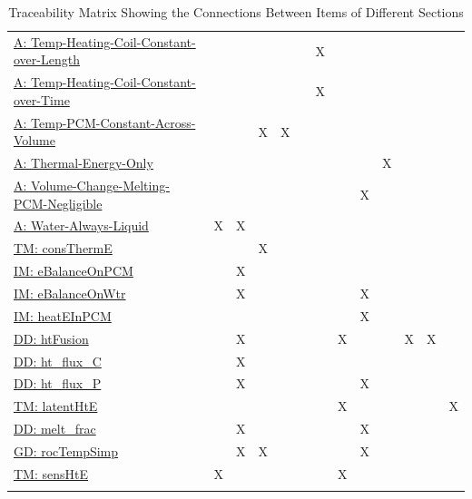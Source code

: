 \documentclass[12pt]{article}
\begin{document}
\begin{longtable}{l l l l l l l l l l l l l}
\\
\hyperref[A:Temp-Heating-Coil-Constant-over-Length]{A: Temp-Heating-Coil-Constant-over-Length} &  &  &  &  &  & X &  &  &  &  &  & 
\\
\hyperref[A:Temp-Heating-Coil-Constant-over-Time]{A: Temp-Heating-Coil-Constant-over-Time} &  &  &  &  &  & X &  &  &  &  &  & 
\\
\hyperref[A:Temp-PCM-Constant-Across-Volume]{A: Temp-PCM-Constant-Across-Volume} &  &  & X & X &  &  &  &  &  &  &  & 
\\
\hyperref[A:Thermal-Energy-Only]{A: Thermal-Energy-Only} &  &  &  &  &  &  &  &  & X &  &  & 
\\
\hyperref[A:Volume-Change-Melting-PCM-Negligible]{A: Volume-Change-Melting-PCM-Negligible} &  &  &  &  &  &  &  & X &  &  &  & 
\\
\hyperref[A:Water-Always-Liquid]{A: Water-Always-Liquid} & X & X &  &  &  &  &  &  &  &  &  & 
\\
\hyperref[T:consThermE]{TM: consThermE} &  &  & X &  &  &  &  &  &  &  &  & 
\\
\hyperref[IM:eBalanceOnPCM]{IM: eBalanceOnPCM} &  & X &  &  &  &  &  &  &  &  &  & 
\\
\hyperref[IM:eBalanceOnWtr]{IM: eBalanceOnWtr} &  & X &  &  &  &  &  & X &  &  &  & 
\\
\hyperref[IM:heatEInPCM]{IM: heatEInPCM} &  &  &  &  &  &  &  & X &  &  &  & 
\\
\hyperref[DD:htFusion]{DD: htFusion} &  & X &  &  &  &  & X &  &  & X & X & 
\\
\hyperref[DD:ht.flux.C]{DD: ht\_flux\_C} &  & X &  &  &  &  &  &  &  &  &  & 
\\
\hyperref[DD:ht.flux.P]{DD: ht\_flux\_P} &  & X &  &  &  &  &  & X &  &  &  & 
\\
\hyperref[T:latentHtE]{TM: latentHtE} &  &  &  &  &  &  & X &  &  &  &  & X
\\
\hyperref[DD:melt.frac]{DD: melt\_frac} &  & X &  &  &  &  &  & X &  &  &  & 
\\
\hyperref[GD:rocTempSimp]{GD: rocTempSimp} &  & X & X &  &  &  &  & X &  &  &  & 
\\
\hyperref[T:sensHtE]{TM: sensHtE} & X &  &  &  &  &  & X &  &  &  &  & 
\\
\bottomrule
\caption{Traceability Matrix Showing the Connections Between Items of Different Sections}
\label{Table:Tracey}
\end{longtable}
\end{document}
